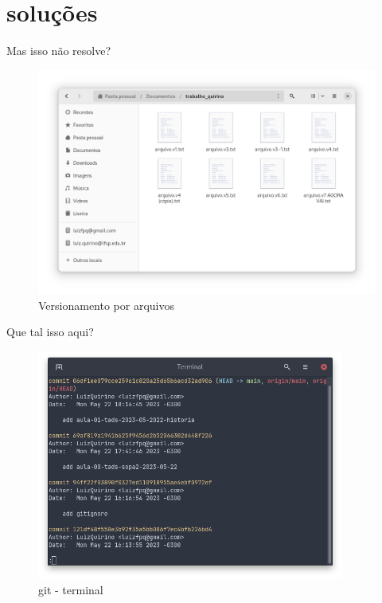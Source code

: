 \documentclass{beamer}
\begin{document}
\section{soluções}
\begin{frame}[fragile]{Mas isso não resolve?}
      \begin{figure}[H]
            \centerline{\includegraphics[width=1.0\textwidth]{assets/aula-tdsi-ifds-2023-05-24/Captura de tela de 2023-05-23 11-29-31.png}}
            \caption{Versionamento por arquivos}
        \end{figure}
\end{frame}

\begin{frame}[fragile]{Que tal isso aqui?}
      \begin{figure}[H]
            \centerline{\includegraphics[width=0.9\textwidth]{assets/aula-tdsi-ifds-2023-05-24/Captura de tela de 2023-05-23 11-32-10.png}}
            \caption{git - terminal}
        \end{figure}
\end{frame}
\end{document}
